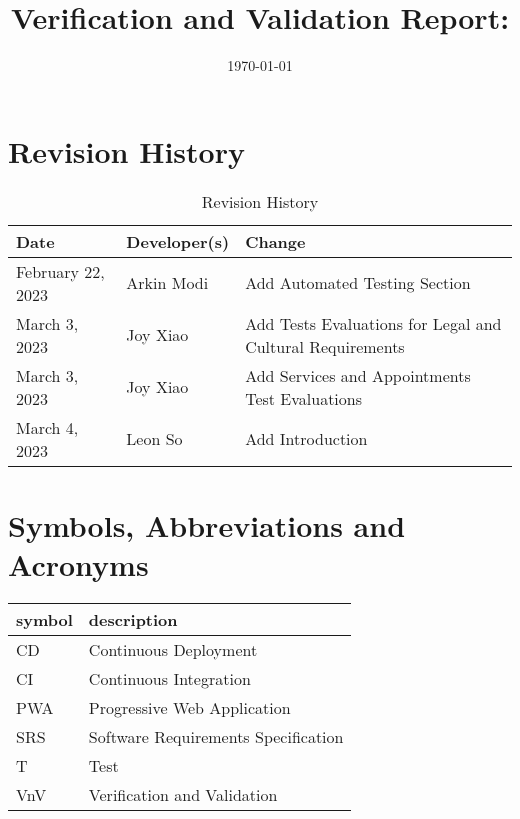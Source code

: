\documentclass[12pt, titlepage]{article}
\begin{document}
\title{Verification and Validation Report: \progname}
\author{\authname}
\date{\today}

\maketitle


\section{Revision History}

\begin{table}[hp]
	\caption{Revision History} \label{TblRevisionHistory}
	\begin{tabularx}{\textwidth}{llX}
		\toprule
		\textbf{Date}     & \textbf{Developer(s)} & \textbf{Change}                                           \\
		\midrule
		February 22, 2023 & Arkin Modi            & Add Automated Testing Section                             \\
		March 3, 2023     & Joy Xiao              & Add Tests Evaluations for Legal and Cultural Requirements \\
		March 3, 2023     & Joy Xiao              & Add Services and Appointments Test Evaluations            \\
		March 4, 2023     & Leon So               & Add Introduction                                          \\
		\bottomrule
	\end{tabularx}
\end{table}
\newpage

\section{Symbols, Abbreviations and Acronyms}

\renewcommand{\arraystretch}{1.2}
\begin{tabular}{l l}
	\toprule
	\textbf{symbol} & \textbf{description}                \\
	\midrule
	CD              & Continuous Deployment               \\
	CI              & Continuous Integration              \\
	PWA             & Progressive Web Application         \\
	SRS             & Software Requirements Specification \\
	T               & Test                                \\
	VnV             & Verification and Validation         \\
	\bottomrule
\end{tabular}\\
\end{document}
